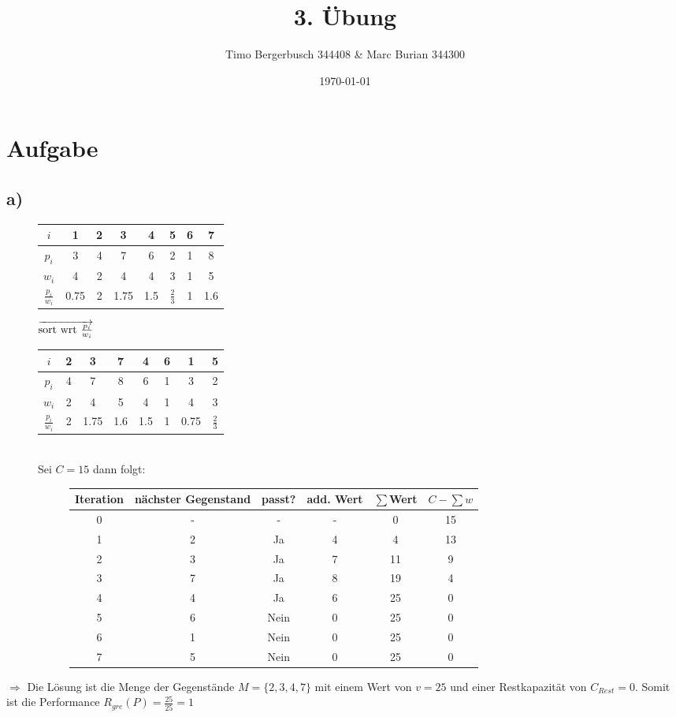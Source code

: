 \documentclass[12pt]{article}
\begin{document}
	
	\title{3. Übung}
	\author{Timo Bergerbusch 344408 \& Marc Burian 344300}
	\date{\specialdate\today}
	\maketitle
	
	
	\section{Aufgabe}
	\subsection{a)}
	
	\begin{figure}[H]
		\centering
		\begin{tabular}{c | c c c c c c c}
			$i$ & 1 & 2 & 3 & 4 & 5 & 6 & 7 \\ \hline
			$p_i$ & 3 & 4 & 7 & 6 & 2 & 1 & 8\\
			$w_i$ & 4 & 2 & 4 & 4 & 3 & 1 & 5\\
			$\frac{p_i}{w_i}$ & 0.75 & 2 & 1.75 & 1.5 & $\frac{2}{3}$ & 1 & 1.6 \\
		\end{tabular}
		 $\overrightarrow{$sort wrt $\frac{p_i}{w_i}}$ 
		 \begin{tabular}{c | c c c c c c c}
		 	$i$ 				&	2	& 3 	& 7 & 4 	& 6 &	1		& 5 			\\ \hline
		 	$p_i$ 				&	4	& 7 	& 8 & 6 	& 1 &	3 		& 2 			\\
		 	$w_i$ 				&	2	& 4 	& 5 & 4 	& 1 &	4		& 3 			\\
		 	$\frac{p_i}{w_i}$ 	&	2	& 1.75 	& 1.6 & 1.5 	& 1 &	0.75	& $\frac{2}{3}$ \\
		 \end{tabular}
		 \\
		 Sei $C=15$ dann folgt:
		 
		 \begin{figure}[H]
		 	\centering
		 	\begin{tabular}{c | c c c c c}
		 		Iteration & nächster Gegenstand & passt? & add. Wert & $\sum$Wert & $C-\sum w$ \\ \hline
		 		0 & - & - & - & 0 & 15 \\
		 		1 & 2 & Ja & 4 & 4 & 13 \\
		 		2 & 3 & Ja & 7 & 11 & 9 \\
		 		3 & 7 & Ja & 8 & 19 & 4 \\
		 		4 & 4 & Ja & 6 & 25 & 0 \\
		 		5 & 6 & Nein & 0 & 25 & 0 \\
		 		6 & 1 & Nein & 0 & 25 & 0 \\
		 		7 & 5 & Nein & 0 & 25 & 0 \\
		 	\end{tabular}
		\end{figure}
	\end{figure}
	$\Rightarrow$ Die Lösung ist die Menge der Gegenstände $M=\{2,3,4,7\}$ mit einem Wert von $v=25$ und einer Restkapazität von $C_{Rest}=0$. Somit ist die Performance $R_{gre}(P)=\frac{25}{25}=1$
	
\end{document}
